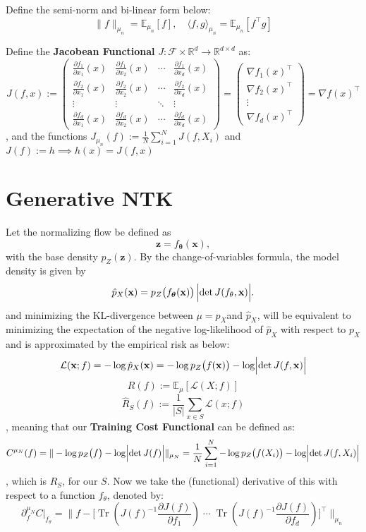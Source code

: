 \documentclass[11pt, a4paper]{article}
\theoremstyle{definition}
\theoremstyle{remark}
\newcommand{\E}{\mathbb{E}}
\newcommand{\empnorm}[1]{\|#1\|_{\mu_n}}
\newcommand{\inner}[2]{\langle #1 , #2 \rangle }
\newcommand{\tr}{\operatorname{Tr}}
\begin{document}
	Define the semi-norm and bi-linear form below:
	\[
	\empnorm{f} = \E_{\mu_n}[f], \quad \inner{f}{g}_{\mu_n} = \E_{\mu_{n}}[f^\top g]
	\]
	
	
	
	Define the \textbf{Jacobean Functional} \(J:\mathcal{F}\times \mathbb{R}^d \to \mathbb{R}^{d\times d}\) as:
	\[
	J(f,x):=
	\begin{pmatrix}
		\frac{\partial f_1}{\partial x_1}(x) & \frac{\partial f_1}{\partial x_2}(x) & \cdots & \frac{\partial f_1}{\partial x_d}(x) \\
		\frac{\partial f_2}{\partial x_1}(x) & \frac{\partial f_2}{\partial x_2}(x) & \cdots & \frac{\partial f_2}{\partial x_d}(x) \\
		\vdots & \vdots & \ddots & \vdots \\
		\frac{\partial f_d}{\partial x_1}(x) & \frac{\partial f_d}{\partial x_2}(x) & \cdots & \frac{\partial f_d}{\partial x_d}(x)
	\end{pmatrix}
	= 	\begin{pmatrix}
	    \nabla f_1(x)^\top \\
		\nabla f_2(x)^\top \\
		\vdots \\
		\nabla f_d(x)^\top
	\end{pmatrix} = \nabla f(x)^\top
	\],
	 and the functions \(J_{\mu_n}(f) := \frac{1}{N} \sum_{i=1}^{N} J(f,X_i) \) and \(J(f):=h \implies h(x)=J(f,x)\)

	
	\section{Generative NTK}
	
	Let the normalizing flow be defined as
	\[
	\mathbf{z} = f_{\boldsymbol{\theta}}(\mathbf{x}),
	\]
	with the base density \( p_Z(\mathbf{z}) \). By the change-of-variables formula, the model density is given by
	\[
	\hat{p}_X(\mathbf{x}) = p_Z\bigl(f_{\boldsymbol{\theta}}(\mathbf{x})\bigr) \, \Bigl|\det J(f_\theta,\mathbf{x}) \Bigr|.
	\]
	and minimizing the KL-divergence between \(\mu=p_X\)and \(\hat{p}_X\), will be equivalent to minimizing the expectation of the negative log-likelihood of \(\hat{p}_X\) with respect to \(p_X\) and is approximated by the empirical risk as below:
	\[
	\mathcal{L}(\mathbf{x}; f) = -\log\hat{p}_X(\mathbf{x}) = -\log p_Z\bigl(f(\mathbf{x})\bigr) - \log \Bigl|\det J(f,\mathbf{x}) \Bigr|
	\]
	\[
	R(f):=\E_\mu[\mathcal{L}(X; f)]
	\]
	\[
	\hat{R}_S(f):=\frac{1}{|S|}\sum_{x\in S} \mathcal{L}(x;f)
	\]
	, meaning that our \textbf{Training Cost Functional} can be defined as:
	\[
	C^{\mu_N}(f) = \| -\log p_Z\bigl(f \bigr) - \log \Bigl|\det J(f) \Bigr| \|_{\mu_N} =\frac{1}{N} \sum_{i=1}^{N}  -\log p_Z\bigl(f(X_i)\bigr) - \log \Bigl|\det J(f,X_i)\Bigr|
	\]
	, which is \(\hat{R}_S\), for our \(S\).
	Now we take the (functional) derivative of this with respect to a function \(f_\theta\), denoted by:
	\[
	\partial^{\mu_N}_{f} C\bigr|_{f_\theta} = \empnorm{ 
		f - \bigl[ \tr\left( J(f)^{-1} \frac{\partial J(f)}{\partial f_1} \right) \; \cdots \; \tr\left( J(f)^{-1} \frac{\partial J(f)}{\partial f_d} \right) \bigr]^\top
	}  
	\]
	
\end{document}
